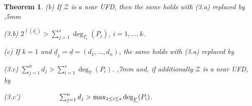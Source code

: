 \documentclass[10pt,a4paper]{amsart}
\newtheorem{thm}{Theorem}
\begin{document}
\begin{thm}
\noindent
{\rm (b)} If ${\mathcal Z}$ is a {\it near UFD}, then the same holds with {\rm (3.a)}
replaced by 
,5mm

\noindent
{\rm (3.b)} \hskip 20mm $2^{\ell({\underline d}_i)} > \sum_{j=1}^s \deg_{T_i}(P_j)$, \hskip 3mm $i=1,\ldots,k$.
\vskip 2mm

\noindent
{\rm (c)} If $k=1$ and $\underline {d}_1 = \underline d = (d_1,\ldots,d_n)$, 
the same holds with {\rm (3.a)}
replaced by 
\vskip 1mm

\noindent
{\rm (3.c)} \hskip 20mm $\sum_{j=1}^n d_j > \sum_{i=1}^s\deg_{\underline{Y}}(P_i)$.
,7mm
\noindent
and, if additionally ${\mathcal Z}$ is a {near UFD}, by 
\vskip 1mm


\noindent 
{\rm (3.c')}$ \hskip 20mm\sum_{j=1}^n d_j  > \max_{1 \leq i \leq s}\deg_{\underline{Y}}(P_i)$.

\end{thm}
\end{document}
